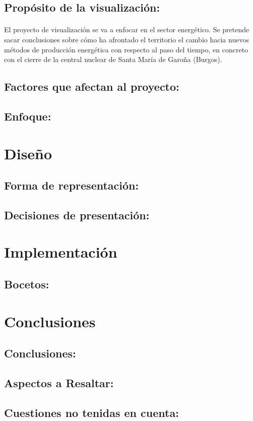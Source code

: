 \documentclass{article}
\begin{document}
		\subsection{Propósito de la visualización:}
	
			\paragraph{}
			El proyecto de visualización se va a enfocar en el sector energético. Se pretende sacar conclusiones sobre cómo ha afrontado el territorio el cambio hacia nuevos métodos de producción energética con respecto al paso del tiempo, en concreto con el cierre de la central nuclear de Santa María de Garoña (Burgos). 


		\subsection{Factores que afectan al proyecto:}


		\subsection{Enfoque:}


	\section{Diseño}		
	
		\subsection{Forma de representación:}
		
	
		\subsection{Decisiones de presentación:}


	\section{Implementación}

		\subsection{Bocetos:}

	
	\section{Conclusiones}
	
		\subsection{Conclusiones:}
	
	
		\subsection{Aspectos a Resaltar:}
	
	
		\subsection{Cuestiones no tenidas en cuenta:}
\end{document}
